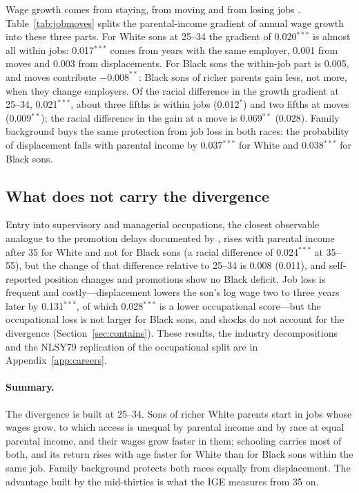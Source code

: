 Wage growth comes from staying, from moving and from losing jobs \citep{topel1992job, altonji2013modeling}.
Table~\ref{tab:jobmoves} splits the parental-income gradient of annual wage growth into these three parts. For White
sons at 25--34 the gradient of 0.020$^{***}$ is almost all within jobs: 0.017$^{***}$ comes from years with the same
employer, 0.001 from moves and 0.003 from displacements. For Black sons the within-job part is 0.005, and moves
contribute $-0.008^{**}$: Black sons of richer parents gain less, not more, when they change employers. Of the racial
difference in the growth gradient at 25--34, 0.021$^{***}$, about three fifths is within jobs (0.012$^{*}$) and two fifths
at moves (0.009$^{**}$); the racial difference in the gain at a move is 0.069$^{**}$ (0.028). Family background buys the
same protection from job loss in both races: the probability of displacement falls with parental income by 0.037$^{***}$
for White and 0.038$^{***}$ for Black sons.



\subsection{What does not carry the divergence}

Entry into supervisory and managerial occupations, the closest observable analogue to the promotion delays documented
by \citet{hegde2026racial}, rises with parental income after 35 for White and not for Black sons (a racial difference of
0.024$^{***}$ at 35--55), but the change of that difference relative to 25--34 is 0.008 (0.011), and self-reported
position changes and promotions show no Black deficit. Job loss is frequent and costly---displacement lowers the son's log
wage two to three years later by 0.131$^{***}$, of which 0.028$^{***}$ is a lower occupational score---but the
occupational loss is not larger for Black sons, and shocks do not account for the divergence (Section~\ref{sec:contains}).
These results, the industry decompositions and the NLSY79 replication of the occupational split are in
Appendix~\ref{app:careers}.

\paragraph{Summary.} The divergence is built at 25--34. Sons of richer White parents start in jobs whose wages grow,
to which access is unequal by parental income and by race at equal parental income, and their wages grow faster in
them; schooling carries most of both, and its return rises with age faster for White than for Black sons within the same
job. Family background protects both races equally from displacement. The advantage built by the mid-thirties is what
the IGE measures from 35 on.
